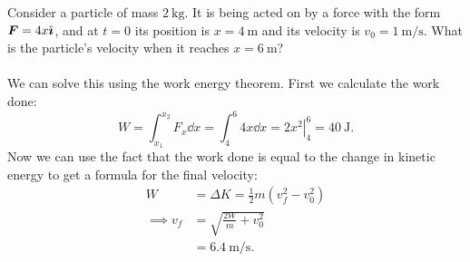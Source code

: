 \documentclass[../classical_mechanics.tex]{subfiles}
\begin{document}
        \begin{example}
            Consider a particle of mass $\qty{2}{\kilogram}$.
            It is being acted on by a force with the form $\boldsymbol{F}=4x\hat{\boldsymbol{\imath}}$, and at $t=0$ its position is $x=\qty{4}{\meter}$ and its velocity is $v_0=\qty{1}{\meter\per\second}$.
            What is the particle's velocity when it reaches $x=\qty{6}{\meter}$?

            \paragraph{}
            We can solve this using the work energy theorem.
            First we calculate the work done:
            \begin{equation}
                W=\int_{x_1}^{x_2}F_x\dd{x}=\int_{4}^{6}4x\dd{x}=\left.2x^2\right|_4^6=\qty{40}{\joule}.
            \end{equation}
            Now we can use the fact that the work done is equal to the change in kinetic energy to get a formula for the final velocity:
            \begin{align}
                W&=\Delta K=\frac{1}{2}m(v_f^2-v_0^2)\\
                \implies v_f&=\sqrt{\frac{2W}{m}+v_0^2}\\
                &=\qty{6.4}{\meter\per\second}.
            \end{align}
        \end{example}
\end{document}
